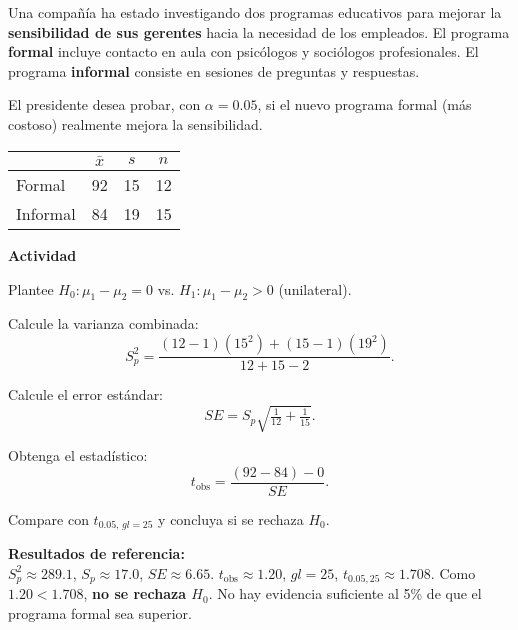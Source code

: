 \begin{ejercicio}
Una compañía ha estado investigando dos programas educativos para mejorar la \textbf{sensibilidad de sus gerentes} hacia la necesidad de los empleados.
El programa \textbf{formal} incluye contacto en aula con psicólogos y sociólogos profesionales.
El programa \textbf{informal} consiste en sesiones de preguntas y respuestas.

El presidente desea probar, con $\alpha=0.05$, si el nuevo programa formal (más costoso) realmente mejora la sensibilidad.

\begin{center}
\begin{tabular}{@{}lccc@{}}
\toprule
 & $\bar{x}$ & $s$ & $n$ \\
\midrule
Formal & 92 & 15 & 12 \\
Informal & 84 & 19 & 15 \\
\bottomrule
\end{tabular}
\end{center}

\textbf{Actividad}
\begin{pasos}
  \item Plantee $H_0:\mu_1-\mu_2=0$ \quad vs. \quad $H_1:\mu_1-\mu_2>0$ (unilateral).
  \item Calcule la varianza combinada:
  \[
  S_p^2 = \frac{(12-1)(15^2)+(15-1)(19^2)}{12+15-2}.
  \]
  \item Calcule el error estándar:
  \[
  SE = S_p \sqrt{\tfrac{1}{12}+\tfrac{1}{15}}.
  \]
  \item Obtenga el estadístico:
  \[
  t_{\text{obs}} = \frac{(92-84)-0}{SE}.
  \]
  \item Compare con $t_{0.05,\,gl=25}$ y concluya si se rechaza $H_0$.
\end{pasos}

\begin{clave}
\noindent \textbf{Resultados de referencia:}\\
$S_p^2 \approx 289.1$, $S_p\approx 17.0$, $SE\approx 6.65$.
$t_{\text{obs}} \approx 1.20$, $gl=25$, $t_{0.05,25}\approx 1.708$.
Como $1.20 < 1.708$, \textbf{no se rechaza $H_0$}. No hay evidencia suficiente al 5\% de que el programa formal sea superior.
\end{clave}
\end{ejercicio}


